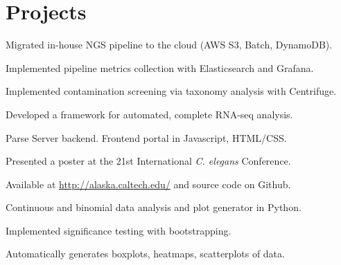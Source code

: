 \documentclass[]{resume}
\begin{document}
\begin{minipage}[t]{0.66\textwidth}


\section{Projects}
\vspace{\topsep} %
\begin{tightemize}
\item Migrated in-house NGS pipeline to the cloud (AWS S3, Batch, DynamoDB).
\item Implemented pipeline metrics collection with Elasticsearch and Grafana.
\item Implemented contamination screening via taxonomy analysis with Centrifuge.
\end{tightemize}
\sectionsep

\begin{tightemize}
\item Developed a framework for automated, complete RNA-seq analysis.
\item Parse Server backend. Frontend portal in Javascript, HTML/CSS.
\item Presented a poster at the 21st International \textit{C. elegans} Conference.
\item Available at \textcolor{blue}{ \href{http://alaska.caltech.edu/}{http://alaska.caltech.edu/}} and source code on Github.
\end{tightemize}
\sectionsep

\begin{tightemize}
\item Continuous and binomial data analysis and plot generator in Python.
\item Implemented significance testing with bootstrapping.
\item Automatically generates boxplots, heatmaps, scatterplots of data.
\end{tightemize}
\sectionsep


\end{minipage}
\end{document}

